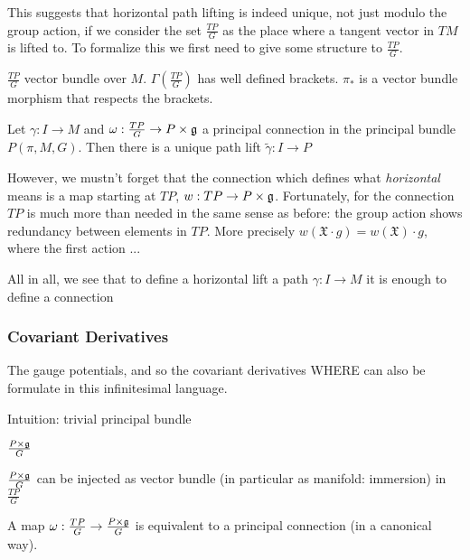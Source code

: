 This suggests that horizontal path lifting is indeed unique, not just modulo the group action, if we consider the set $\frac{TP}{G}$ as the place where a tangent vector in $TM$ is lifted to. To formalize this we first need to give some structure to $\frac{TP}{G}$.

\begin{definition}
$\frac{TP}{G}$ vector bundle over $M$. $\Gamma(\frac{TP}{G})$ has well defined brackets. $\pi_{*}$ is a vector bundle morphism that respects the brackets.
\end{definition}

\begin{theorem}
Let $\gamma:I \to M$ and $\omega:\frac{TP}{G} \to P \times \mathfrak{g}$ a principal connection in the principal bundle $P(\pi, M, G)$. Then there is a unique path lift $\tilde{\gamma}:I \to P$
\end{theorem}
However, we mustn't forget that the connection which defines what \emph{horizontal} means is  a map starting at $TP$,  $w:TP \to P\times \mathfrak{g}$. Fortunately, for the connection $TP$ is much more than needed in the same sense as before: the group action shows redundancy between elements in $TP$. More precisely $w(\mathfrak{X}\cdot g) = w(\mathfrak{X}) \cdot g$, where the first action ...

All in all, we see that to define a horizontal lift a path $\gamma: I \to M$ it is enough to define a connection

\subsubsection{Covariant Derivatives}

The gauge potentials, and so the covariant derivatives WHERE can also be formulate in this infinitesimal language. 

Intuition: trivial principal bundle

\begin{definition}
$\frac{P \times \mathfrak{g}}{G}$
\end{definition}

\begin{proposition}
$\frac{P \times \mathfrak{g}}{G}$ can be injected as vector bundle (in particular as manifold: immersion) in $\frac{TP}{G}$
\end{proposition}

\begin{theorem}
A map $\omega:\frac{TP}{G} \to \frac{P \times \mathfrak{g}}{G}$ is equivalent to a principal connection (in a canonical way).
\end{theorem}

